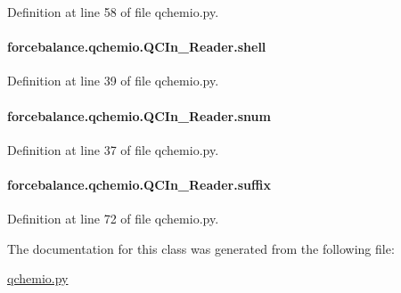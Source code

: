 Definition at line 58 of file qchemio.\-py.

\hypertarget{classforcebalance_1_1qchemio_1_1QCIn__Reader_a7cc88079e27ea6aa7550e28d57ec6afb}{
\paragraph[{shell}]{\setlength{\rightskip}{0pt plus 5cm}forcebalance.\-qchemio.\-Q\-C\-In\-\_\-\-Reader.\-shell}}\label{classforcebalance_1_1qchemio_1_1QCIn__Reader_a7cc88079e27ea6aa7550e28d57ec6afb}


Definition at line 39 of file qchemio.\-py.

\hypertarget{classforcebalance_1_1qchemio_1_1QCIn__Reader_ad3615ef269aab5468394d3d49d49b754}{
\paragraph[{snum}]{\setlength{\rightskip}{0pt plus 5cm}forcebalance.\-qchemio.\-Q\-C\-In\-\_\-\-Reader.\-snum}}\label{classforcebalance_1_1qchemio_1_1QCIn__Reader_ad3615ef269aab5468394d3d49d49b754}


Definition at line 37 of file qchemio.\-py.

\hypertarget{classforcebalance_1_1qchemio_1_1QCIn__Reader_ae20caa518b899a0f26916966625ca40c}{
\paragraph[{suffix}]{\setlength{\rightskip}{0pt plus 5cm}forcebalance.\-qchemio.\-Q\-C\-In\-\_\-\-Reader.\-suffix}}\label{classforcebalance_1_1qchemio_1_1QCIn__Reader_ae20caa518b899a0f26916966625ca40c}


Definition at line 72 of file qchemio.\-py.



The documentation for this class was generated from the following file\-:\begin{DoxyCompactItemize}
\item 
\hyperlink{qchemio_8py}{qchemio.\-py}\end{DoxyCompactItemize}
